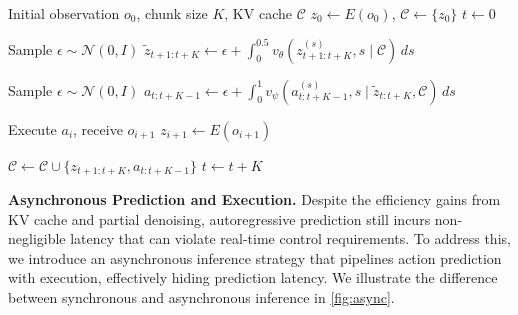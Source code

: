 \documentclass[onecolumn]{robbyant}           %
\begin{document}
\begin{algorithm}[t]
\caption{KV Cache Inference}
\label{alg:kv_inference}
\begin{algorithmic}[1]
\Require Initial observation $o_0$, chunk size $K$, KV cache $\mathcal{C}$
\State $z_0 \gets E(o_0)$, $\mathcal{C} \gets \{z_0\}$
\State $t \gets 0$

\MainLoop
    \State Sample $\epsilon \sim \mathcal{N}(0, I)$ 
    \State $\tilde{z}_{t+1:t+K} \gets \epsilon + \int_0^{0.5} v_\theta(z^{(s)}_{t+1:t+K}, s \mid \mathcal{C}) \, ds$
   
    \State Sample $\epsilon \sim \mathcal{N}(0, I)$ 
    \State $a_{t:t+K-1} \gets \epsilon + \int_0^{1} v_\psi(a^{(s)}_{t:t+K-1}, s \mid \tilde{z}_{t:t+K}, \mathcal{C}) \, ds$
    
        \State Execute $a_i$, receive $o_{i+1}$ 
        \State $z_{i+1} \gets E(o_{i+1})$
    \EndFor
    
    \State $\mathcal{C} \gets \mathcal{C} \cup \{z_{t+1:t+K}, a_{t:t+K-1}\}$ 
    \State $t \gets t + K$
\EndMainLoop %
\end{algorithmic}
\end{algorithm}






\noindent\textbf{Asynchronous Prediction and Execution.}
Despite the efficiency gains from KV cache and partial denoising, autoregressive prediction still incurs non-negligible latency that can violate real-time control requirements.
To address this, we introduce an asynchronous inference strategy that pipelines action prediction with execution, effectively hiding prediction latency.
We illustrate the difference between synchronous and asynchronous inference in \cref{fig:async}.
\end{document}
